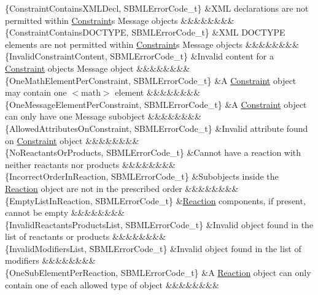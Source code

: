 \begin{DoxyParagraph}{}
\begin{longtabu}
\{Constraint\+Contains\+X\+M\+L\+Decl, S\+B\+M\+L\+Error\+Code\+\_\+t\} &X\+ML declarations are not permitted within \hyperlink{class_constraint}{Constraint}\textquotesingle{}s Message objects &&&&&&&&\\
\{Constraint\+Contains\+D\+O\+C\+T\+Y\+PE, S\+B\+M\+L\+Error\+Code\+\_\+t\} &X\+ML D\+O\+C\+T\+Y\+PE elements are not permitted within \hyperlink{class_constraint}{Constraint}\textquotesingle{}s Message objects &&&&&&&&\\
\{Invalid\+Constraint\+Content, S\+B\+M\+L\+Error\+Code\+\_\+t\} &Invalid content for a \hyperlink{class_constraint}{Constraint} object\textquotesingle{}s Message object &&&&&&&&\\
\{One\+Math\+Element\+Per\+Constraint, S\+B\+M\+L\+Error\+Code\+\_\+t\} &A \hyperlink{class_constraint}{Constraint} object may contain one {\ttfamily $<$math$>$} element &&&&&&&&\\
\{One\+Message\+Element\+Per\+Constraint, S\+B\+M\+L\+Error\+Code\+\_\+t\} &A \hyperlink{class_constraint}{Constraint} object can only have one Message subobject &&&&&&&&\\
\{Allowed\+Attributes\+On\+Constraint, S\+B\+M\+L\+Error\+Code\+\_\+t\} &Invalid attribute found on \hyperlink{class_constraint}{Constraint} object &&&&&&&&\\
\{No\+Reactants\+Or\+Products, S\+B\+M\+L\+Error\+Code\+\_\+t\} &Cannot have a reaction with neither reactants nor products &&&&&&&&\\
\{Incorrect\+Order\+In\+Reaction, S\+B\+M\+L\+Error\+Code\+\_\+t\} &Subobjects inside the \hyperlink{class_reaction}{Reaction} object are not in the prescribed order &&&&&&&&\\
\{Empty\+List\+In\+Reaction, S\+B\+M\+L\+Error\+Code\+\_\+t\} &\hyperlink{class_reaction}{Reaction} components, if present, cannot be empty &&&&&&&&\\
\{Invalid\+Reactants\+Products\+List, S\+B\+M\+L\+Error\+Code\+\_\+t\} &Invalid object found in the list of reactants or products &&&&&&&&\\
\{Invalid\+Modifiers\+List, S\+B\+M\+L\+Error\+Code\+\_\+t\} &Invalid object found in the list of modifiers &&&&&&&&\\
\{One\+Sub\+Element\+Per\+Reaction, S\+B\+M\+L\+Error\+Code\+\_\+t\} &A \hyperlink{class_reaction}{Reaction} object can only contain one of each allowed type of object &&&&&&&&\\

\end{longtabu}
\end{DoxyParagraph}
